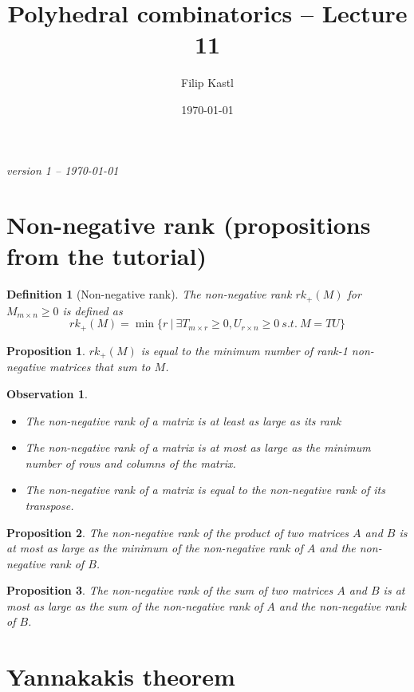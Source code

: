 \documentclass{article}
\title{Polyhedral combinatorics -- Lecture 11}
\author{Filip Kastl}
\date{\today}
\newtheorem*{definition}{Definition}
\newtheorem*{proposition}{Proposition}
\newtheorem*{observation}{Observation}
\begin{document}
\maketitle

\noindent
\emph{version 1 -- \today}

\section{Non-negative rank (propositions from the tutorial)}

\begin{definition}[Non-negative rank]
	The \emph{non-negative rank} $rk_+(M)$ for $M_{m \times n} \ge 0$ is
	defined as
	$$
	rk_+(M) = \min \{ r ~|~ \exists T_{m \times r} \ge 0, U_{r \times n}
	\ge 0 ~s.t.~ M = TU \}
	$$
\end{definition}

\begin{proposition}
	$rk_+(M)$ is equal to the minimum number of rank-1 non-negative
	matrices that sum to $M$.
\end{proposition}

\begin{observation}
	~
	\begin{itemize}
		\item The non-negative rank of a matrix is at least as large as
			its rank
		\item The non-negative rank of a matrix is at most as large as
			the minimum number of rows and columns of the matrix.
		\item The non-negative rank of a matrix is equal to the
			non-negative rank of its transpose.
	\end{itemize}
\end{observation}

\begin{proposition}
	The non-negative rank of the product of two matrices $A$ and $B$ is at
	most as large as the minimum of the non-negative rank of $A$ and the
	non-negative rank of $B$.
\end{proposition}

\begin{proposition}
	The non-negative rank of the sum of two matrices $A$ and $B$ is at most
	as large as the sum of the non-negative rank of $A$ and the
	non-negative rank of $B$.
\end{proposition}


\section{Yannakakis theorem}
\end{document}

